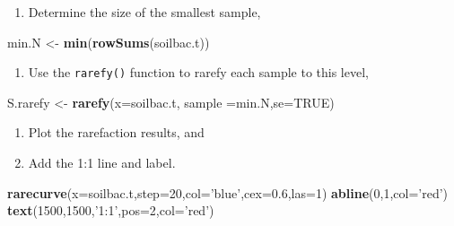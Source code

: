 \documentclass[
]{article}
\newenvironment{Shaded}{\begin{snugshade}}{\end{snugshade}}
\newcommand{\DataTypeTok}[1]{\textcolor[rgb]{0.13,0.29,0.53}{#1}}
\newcommand{\DecValTok}[1]{\textcolor[rgb]{0.00,0.00,0.81}{#1}}
\newcommand{\FloatTok}[1]{\textcolor[rgb]{0.00,0.00,0.81}{#1}}
\newcommand{\KeywordTok}[1]{\textcolor[rgb]{0.13,0.29,0.53}{\textbf{#1}}}
\newcommand{\NormalTok}[1]{#1}
\newcommand{\OtherTok}[1]{\textcolor[rgb]{0.56,0.35,0.01}{#1}}
\newcommand{\StringTok}[1]{\textcolor[rgb]{0.31,0.60,0.02}{#1}}
\providecommand{\tightlist}{%
  \setlength{\itemsep}{0pt}\setlength{\parskip}{0pt}}
\begin{document}
\begin{enumerate}
\def\labelenumi{\arabic{enumi}.}
\setcounter{enumi}{1}
\tightlist
\item
  Determine the size of the smallest sample,
\end{enumerate}

\begin{Shaded}
\begin{Highlighting}[]
\NormalTok{min.N <-}\StringTok{ }\KeywordTok{min}\NormalTok{(}\KeywordTok{rowSums}\NormalTok{(soilbac.t))}
\end{Highlighting}
\end{Shaded}

\begin{enumerate}
\def\labelenumi{\arabic{enumi}.}
\setcounter{enumi}{2}
\tightlist
\item
  Use the \texttt{rarefy()} function to rarefy each sample to this
  level,
\end{enumerate}

\begin{Shaded}
\begin{Highlighting}[]
\NormalTok{S.rarefy <-}\StringTok{ }\KeywordTok{rarefy}\NormalTok{(}\DataTypeTok{x=}\NormalTok{soilbac.t, }\DataTypeTok{sample =}\NormalTok{min.N,}\DataTypeTok{se=}\OtherTok{TRUE}\NormalTok{)}
\end{Highlighting}
\end{Shaded}

\begin{enumerate}
\def\labelenumi{\arabic{enumi}.}
\setcounter{enumi}{3}
\item
  Plot the rarefaction results, and
\item
  Add the 1:1 line and label.
\end{enumerate}

\begin{Shaded}
\begin{Highlighting}[]
\KeywordTok{rarecurve}\NormalTok{(}\DataTypeTok{x=}\NormalTok{soilbac.t,}\DataTypeTok{step=}\DecValTok{20}\NormalTok{,}\DataTypeTok{col=}\StringTok{'blue'}\NormalTok{,}\DataTypeTok{cex=}\FloatTok{0.6}\NormalTok{,}\DataTypeTok{las=}\DecValTok{1}\NormalTok{)}
\KeywordTok{abline}\NormalTok{(}\DecValTok{0}\NormalTok{,}\DecValTok{1}\NormalTok{,}\DataTypeTok{col=}\StringTok{'red'}\NormalTok{)}
\KeywordTok{text}\NormalTok{(}\DecValTok{1500}\NormalTok{,}\DecValTok{1500}\NormalTok{,}\StringTok{'1:1'}\NormalTok{,}\DataTypeTok{pos=}\DecValTok{2}\NormalTok{,}\DataTypeTok{col=}\StringTok{'red'}\NormalTok{)}
\end{Highlighting}
\end{Shaded}
\end{document}
